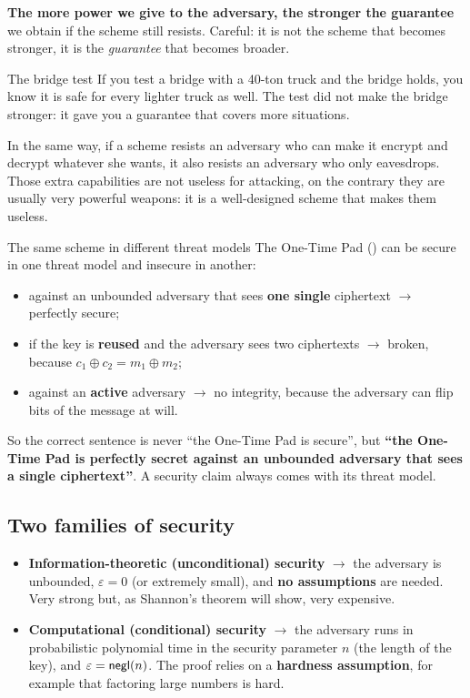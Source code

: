 \textbf{The more power we give to the adversary, the stronger the guarantee} we obtain if the scheme still resists. Careful: it is not the scheme that becomes stronger, it is the \textit{guarantee} that becomes broader.

\begin{framedex}{The bridge test}
  If you test a bridge with a 40-ton truck and the bridge holds, you know it is safe for every lighter truck as well. The test did not make the bridge stronger: it gave you a guarantee that covers more situations.

  In the same way, if a scheme resists an adversary who can make it encrypt and decrypt whatever she wants, it also resists an adversary who only eavesdrops. Those extra capabilities are not useless for attacking, on the contrary they are usually very powerful weapons: it is a well-designed scheme that makes them useless.
\end{framedex}

\begin{framedex}{The same scheme in different threat models}
  The One-Time Pad () can be secure in one threat model and insecure in another:
  \begin{itemize}
    \item against an unbounded adversary that sees \textbf{one single} ciphertext $\to$ perfectly secure;
    \item if the key is \textbf{reused} and the adversary sees two ciphertexts $\to$ broken, because $c_1 \oplus c_2 = m_1 \oplus m_2$;
    \item against an \textbf{active} adversary $\to$ no integrity, because the adversary can flip bits of the message at will.
  \end{itemize}
  So the correct sentence is never ``the One-Time Pad is secure'', but \textbf{``the One-Time Pad is perfectly secret against an unbounded adversary that sees a single ciphertext''}. A security claim always comes with its threat model.
\end{framedex}

\subsection{Two families of security}

\begin{itemize}
  \item \textbf{Information-theoretic (unconditional) security} $\to$ the adversary is unbounded, $\varepsilon = 0$ (or extremely small), and \textbf{no assumptions} are needed. Very strong but, as Shannon's theorem will show, very expensive.
  \item \textbf{Computational (conditional) security} $\to$ the adversary runs in probabilistic polynomial time in the security parameter $n$ (the length of the key), and $\varepsilon = \mathsf{negl}(n)$. The proof relies on a \textbf{hardness assumption}, for example that factoring large numbers is hard.
\end{itemize}

